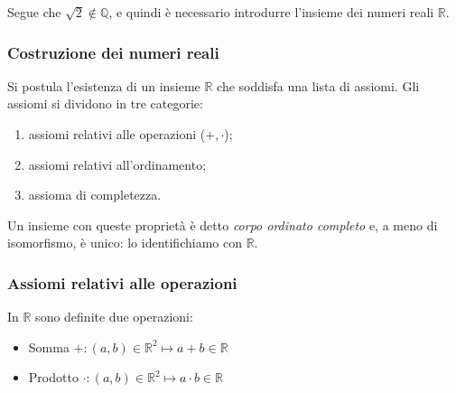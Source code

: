 \documentclass[oneside,10pt]{book} %
\begin{document}


Segue che $\sqrt{2} \notin \mathbb{Q}$, e quindi è necessario introdurre l’insieme dei numeri reali $\mathbb{R}$.


\subsubsection{Costruzione dei numeri reali}
Si postula l’esistenza di un insieme $\mathbb{R}$ che soddisfa una lista di assiomi.
Gli assiomi si dividono in tre categorie:
\begin{enumerate}[label=\Alph*)]
\item assiomi relativi alle operazioni ($+, \cdot$);
\item assiomi relativi all’ordinamento;
\item assioma di completezza.
\end{enumerate}

Un insieme con queste proprietà è detto \emph{corpo ordinato completo} e, a meno di isomorfismo, è unico: lo identifichiamo con $\mathbb{R}$.

\subsubsection{Assiomi relativi alle operazioni}
In $\mathbb{R}$ sono definite due operazioni:
\begin{itemize}
\item Somma \quad $+ : (a, b) \in \mathbb{R}^2 \mapsto a + b \in \mathbb{R}$
\item Prodotto \quad $\cdot : (a, b) \in \mathbb{R}^2 \mapsto a \cdot b \in \mathbb{R}$
\end{itemize}
\end{document}
